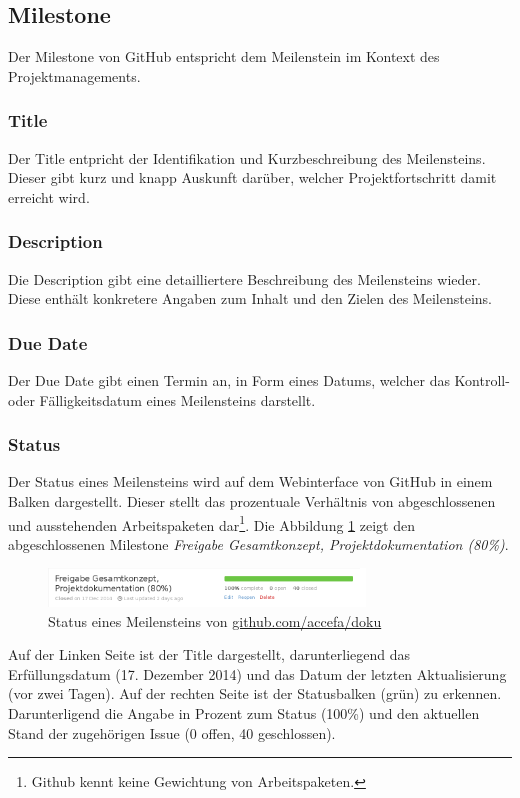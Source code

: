 \subsection{Milestone}
Der \gls{Milestone} von GitHub entspricht dem Meilenstein im Kontext des
Projektmanagements.

\subsubsection{Title}
Der \gls{Title} entpricht der Identifikation und Kurzbeschreibung des
Meilensteins. Dieser gibt kurz und knapp Auskunft darüber, welcher
Projektfortschritt damit erreicht wird.

\subsubsection{Description}
Die \gls{Description} gibt eine detailliertere Beschreibung des Meilensteins
wieder. Diese enthält konkretere Angaben zum Inhalt und den Zielen des
Meilensteins.

\subsubsection{Due Date}
Der \gls{Due Date} gibt einen Termin an, in Form eines Datums, welcher das
Kontroll- oder Fälligkeitsdatum eines Meilensteins darstellt.

\subsubsection{Status}
Der Status eines Meilensteins wird auf dem Webinterface von GitHub in einem
Balken dargestellt. Dieser stellt das prozentuale Verhältnis von
abgeschlossenen und ausstehenden Arbeitspaketen dar\footnote{Github kennt
keine Gewichtung von Arbeitspaketen.}. Die Abbildung
\ref{fig:milestone_progress} zeigt den abgeschlossenen
\gls{Milestone} \emph{Freigabe Gesamtkonzept, Projektdokumentation (80\%)}.
\begin{figure}[h!]
	\centering
	\includegraphics[width=0.75\textwidth]{../../fig/github/milestone_progress.png}
	\caption{Status eines Meilensteins von \url{github.com/accefa/doku}}
	\label{fig:milestone_progress}
\end{figure}

Auf der Linken Seite ist der \gls{Title} dargestellt, darunterliegend das
Erfüllungsdatum (17. Dezember 2014) und das Datum der letzten Aktualisierung
(vor zwei Tagen). Auf der rechten Seite ist der Statusbalken (grün) zu
erkennen. Darunterligend die Angabe in Prozent zum Status (100\%) und den
aktuellen Stand der zugehörigen \gls{Issue} (0 offen, 40 geschlossen).
